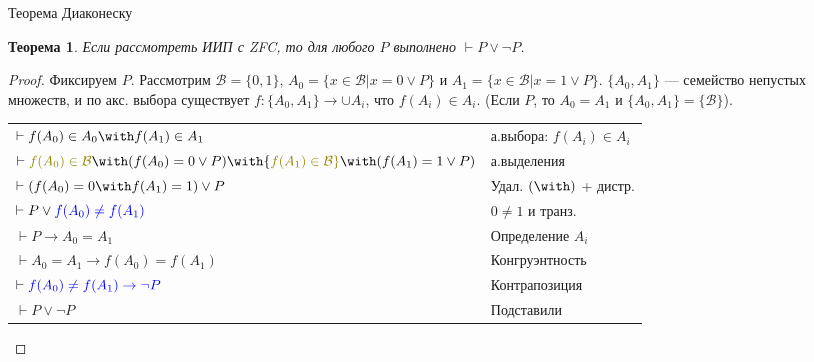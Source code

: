\documentclass[aspectratio=169]{beamer}
\newtheorem{thm}{Теорема}[section]
\begin{document}
\begin{frame}{Теорема Диаконеску}
\begin{thm}Если рассмотреть ИИП с ZFC, то для любого $P$ выполнено $\vdash P \vee \neg P$.\end{thm}
\begin{proof}Фиксируем $P$. Рассмотрим $\mathcal{B} = \{0,1\}$, $A_0 = \{ x \in \mathcal{B} | x = 0 \vee P \}$ и 
$A_1 = \{ x \in \mathcal{B} | x = 1 \vee P\}$.
$\{A_0,A_1\}$ --- семейство непустых множеств, и по акс. выбора существует
$f: \{A_0,A_1\} \rightarrow \cup A_i$, что $f(A_i) \in A_i$. (Если $P$, то $A_0 = A_1$ и $\{A_0,A_1\} = \{\mathcal{B}\}$).

\vspace{0.3cm}
\begin{tabular}{ll}
$\vdash f(A_0) \in A_0 \with f(A_1) \in A_1$ & а.выбора: $f(A_i) \in A_i$\\
$\vdash {\color{olive}f(A_0) \in \mathcal{B}} \with (f(A_0) = 0 \vee P) \with {\color{olive}f(A_1) \in \mathcal{B}} \with (f(A_1) = 1 \vee P)$ & а.выделения\\
$\vdash (f(A_0) = 0 \with f(A_1) = 1) \vee P$ & Удал. $(\with)$ + дистр.\\
$\vdash P\vee{\color{blue}f(A_0) \ne f(A_1)}$ & $0 \ne 1$ и транз.\\\pause
$\vdash P \rightarrow A_0 = A_1$ & Определение $A_i$\\
$\vdash A_0 = A_1 \rightarrow f(A_0) = f(A_1)$ & Конгруэнтность\\
$\vdash \color{blue} f(A_0) \ne f(A_1) \rightarrow \neg P$ & Контрапозиция\\
$\vdash P \vee \neg P$ & Подставили
\end{tabular}
\end{proof}
\end{frame}
\end{document}
